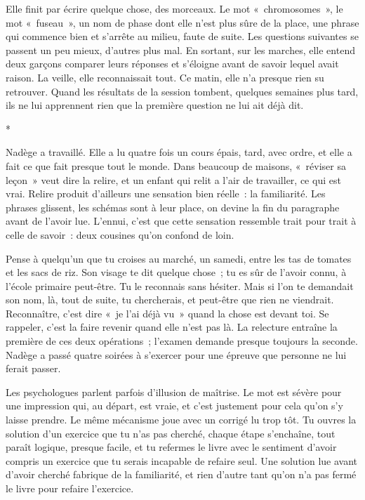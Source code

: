 \documentclass[10.5pt,twoside,openright]{book}
\newcommand{\asterisme}{\par\vspace{0.7em}\centerline{\color{gris}*\quad*\quad*}\vspace{0.7em}\par\noindent}
\begin{document}
Elle finit par écrire quelque chose, des morceaux. Le mot « chromosomes », le mot « fuseau », un nom de phase dont elle n’est plus sûre de la place, une phrase qui commence bien et s’arrête au milieu, faute de suite. Les questions suivantes se passent un peu mieux, d’autres plus mal. En sortant, sur les marches, elle entend deux garçons comparer leurs réponses et s’éloigne avant de savoir lequel avait raison. La veille, elle reconnaissait tout. Ce matin, elle n’a presque rien su retrouver. Quand les résultats de la session tombent, quelques semaines plus tard, ils ne lui apprennent rien que la première question ne lui ait déjà dit.

\asterisme

Nadège a travaillé. Elle a lu quatre fois un cours épais, tard, avec ordre, et elle a fait ce que fait presque tout le monde. Dans beaucoup de maisons, « réviser sa leçon » veut dire la relire, et un enfant qui relit a l’air de travailler, ce qui est vrai. Relire produit d’ailleurs une sensation bien réelle : la familiarité. Les phrases glissent, les schémas sont à leur place, on devine la fin du paragraphe avant de l’avoir lue. L’ennui, c’est que cette sensation ressemble trait pour trait à celle de savoir : deux cousines qu’on confond de loin.

Pense à quelqu’un que tu croises au marché, un samedi, entre les tas de tomates et les sacs de riz. Son visage te dit quelque chose ; tu es sûr de l’avoir connu, à l’école primaire peut-être. Tu le reconnais sans hésiter. Mais si l’on te demandait son nom, là, tout de suite, tu chercherais, et peut-être que rien ne viendrait. Reconnaître, c’est dire « je l’ai déjà vu » quand la chose est devant toi. Se rappeler, c’est la faire revenir quand elle n’est pas là. La relecture entraîne la première de ces deux opérations ; l’examen demande presque toujours la seconde. Nadège a passé quatre soirées à s’exercer pour une épreuve que personne ne lui ferait passer.

Les psychologues parlent parfois d’illusion de maîtrise. Le mot est sévère pour une impression qui, au départ, est vraie, et c’est justement pour cela qu’on s’y laisse prendre. Le même mécanisme joue avec un corrigé lu trop tôt. Tu ouvres la solution d’un exercice que tu n’as pas cherché, chaque étape s’enchaîne, tout paraît logique, presque facile, et tu refermes le livre avec le sentiment d’avoir compris un exercice que tu serais incapable de refaire seul. Une solution lue avant d’avoir cherché fabrique de la familiarité, et rien d’autre tant qu’on n’a pas fermé le livre pour refaire l’exercice.
\end{document}
